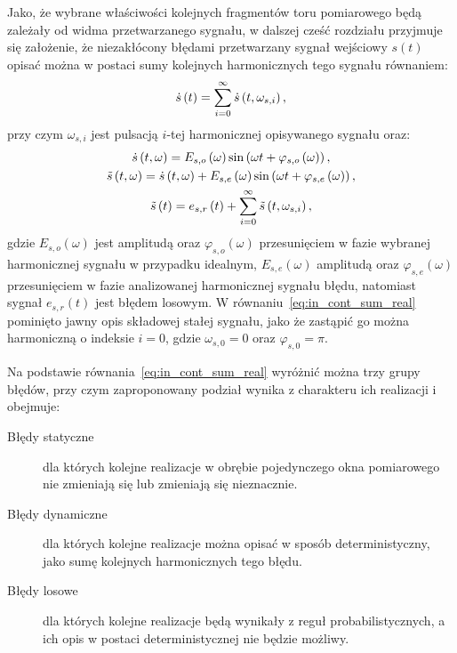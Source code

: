 Jako, że wybrane właściwości kolejnych fragmentów toru pomiarowego będą zależały od widma przetwarzanego sygnału, w dalszej cześć rozdziału przyjmuje się założenie, że niezakłócony błędami przetwarzany sygnał wejściowy $s(t)$ opisać można w postaci sumy kolejnych harmonicznych tego sygnału równaniem:
\begin{equation}
\dot{s} \left(t\right) = \sum _{i = 0} ^{\infty} \dot{s} \left( t, \omega_{s,i} \right) \label{eq:in_cont_sum_ideal},
\end{equation}
przy czym $\omega_{s,i}$ jest pulsacją $i$-tej harmonicznej opisywanego sygnału oraz:
\begin{gather}
\dot{s} \left( t, \omega \right) = E_{s,o} \left(\omega\right) \sin \left( \omega t + \varphi_{s,o} \left(\omega\right) \right) \label{eq:in_cont_omega_ideal}, \\
\tilde{s} \left( t, \omega \right) = \dot{s} \left( t, \omega \right) + E_{s,e} \left(\omega\right) \sin \left( \omega t + \varphi_{s,e} \left(\omega\right) \right) \label{eq:in_cont_omega_real}, \\
\tilde{s} \left(t\right) = e_{s,r} \left(t\right) + \sum _{i = 0} ^{\infty} \tilde{s} \left( t, \omega_{s,i} \right) \label{eq:in_cont_sum_real},
\end{gather}
gdzie $E_{s,o}(\omega)$ jest amplitudą oraz $\varphi_{s,o}(\omega)$ przesunięciem w fazie wybranej harmonicznej sygnału w przypadku idealnym, $E_{s,e}(\omega)$ amplitudą oraz $ \varphi_{s,e}(\omega)$ przesunięciem w fazie analizowanej harmonicznej sygnału błędu, natomiast sygnał $e_{s,r}(t)$ jest błędem losowym. W równaniu~\eqref{eq:in_cont_sum_real} pominięto jawny opis składowej stałej sygnału, jako że zastąpić go można harmoniczną o indeksie $i = 0$, gdzie $\omega_{s,0} = 0$ oraz $\varphi_{s,0} = \pi$.

Na podstawie równania~\eqref{eq:in_cont_sum_real} wyróżnić można trzy grupy błędów, przy czym zaproponowany podział wynika z charakteru ich realizacji i obejmuje:
\begin{description}
\item [Błędy statyczne] dla których kolejne realizacje w obrębie pojedynczego okna pomiarowego nie zmieniają się lub zmieniają się nieznacznie.
\item [Błędy dynamiczne] dla których kolejne realizacje można opisać w sposób deterministyczny, jako sumę kolejnych harmonicznych tego błędu.
\item [Błędy losowe] dla których kolejne realizacje będą wynikały z reguł probabilistycznych, a ich opis w postaci deterministycznej nie będzie możliwy.
\end{description}

